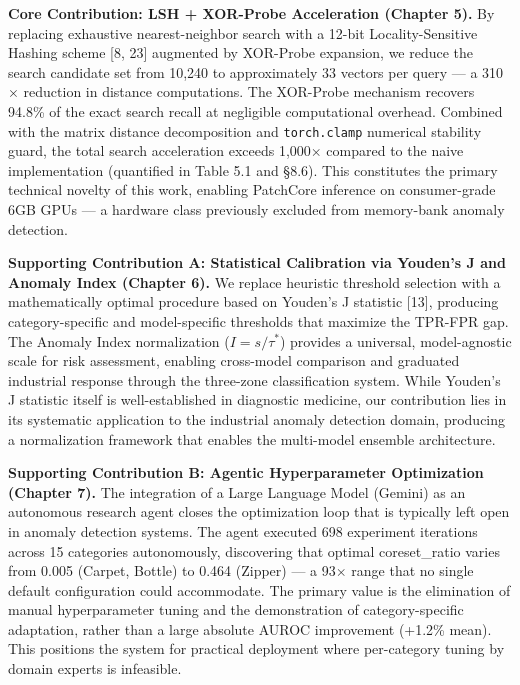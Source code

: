 \documentclass[12pt, a4paper, oneside]{report}
\begin{document}
\textbf{Core Contribution: LSH + XOR-Probe Acceleration (Chapter 5).} By replacing exhaustive nearest-neighbor search with a 12-bit Locality-Sensitive Hashing scheme {[}8, 23{]} augmented by XOR-Probe expansion, we reduce the search candidate set from 10,240 to approximately 33 vectors per query --- a 310$\times$ reduction in distance computations. The XOR-Probe mechanism recovers 94.8\% of the exact search recall at negligible computational overhead. Combined with the matrix distance decomposition and \texttt{torch.clamp} numerical stability guard, the total search acceleration exceeds 1,000$\times$ compared to the naive implementation (quantified in Table 5.1 and §8.6). This constitutes the primary technical novelty of this work, enabling PatchCore inference on consumer-grade 6GB GPUs --- a hardware class previously excluded from memory-bank anomaly detection.

\textbf{Supporting Contribution A: Statistical Calibration via Youden's J and Anomaly Index (Chapter 6).} We replace heuristic threshold selection with a mathematically optimal procedure based on Youden's J statistic {[}13{]}, producing category-specific and model-specific thresholds that maximize the TPR-FPR gap. The Anomaly Index normalization (\(I = s/\tau^*\)) provides a universal, model-agnostic scale for risk assessment, enabling cross-model comparison and graduated industrial response through the three-zone classification system. While Youden's J statistic itself is well-established in diagnostic medicine, our contribution lies in its systematic application to the industrial anomaly detection domain, producing a normalization framework that enables the multi-model ensemble architecture.

\textbf{Supporting Contribution B: Agentic Hyperparameter Optimization (Chapter 7).} The integration of a Large Language Model (Gemini) as an autonomous research agent closes the optimization loop that is typically left open in anomaly detection systems. The agent executed 698 experiment iterations across 15 categories autonomously, discovering that optimal coreset\_ratio varies from 0.005 (Carpet, Bottle) to 0.464 (Zipper) --- a 93$\times$ range that no single default configuration could accommodate. The primary value is the elimination of manual hyperparameter tuning and the demonstration of category-specific adaptation, rather than a large absolute AUROC improvement (+1.2\% mean). This positions the system for practical deployment where per-category tuning by domain experts is infeasible.
\end{document}
